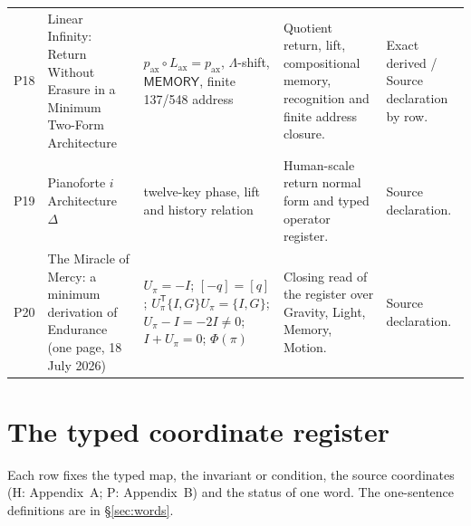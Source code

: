 \documentclass[11pt,a4paper]{article}
\newcommand{\tp}{^{\mathsf T}}
\newcommand{\Lax}{L_{\mathrm{ax}}}\newcommand{\Lpr}{L_{\mathrm{pr}}}
\newcommand{\MEM}{\mathsf{MEMORY}}
\theoremstyle{plain}
\theoremstyle{definition}
\theoremstyle{remark}
\begin{document}
{\begin{longtable}{@{}>{\raggedright\arraybackslash}p{0.8cm}>{\raggedright\arraybackslash}p{4.4cm}>{\raggedright\arraybackslash}p{4.4cm}>{\raggedright\arraybackslash}p{3.1cm}>{\raggedright\arraybackslash}p{2.1cm}@{}}
P18 & Linear Infinity: Return Without Erasure in a Minimum Two-Form Architecture & $p_{\mathrm{ax}}\circ\Lax=p_{\mathrm{ax}}$, $\Lambda$-shift, $\MEM$, finite 137/548 address & Quotient return, lift, compositional memory, recognition and finite address closure. & Exact derived / Source declaration by row.\\
P19 & Pianoforte $i$ Architecture $\Delta$ & twelve-key phase, lift and history relation & Human-scale return normal form and typed operator register. & Source declaration.\\
P20 & The Miracle of Mercy: a minimum derivation of Endurance (one page, 18 July 2026) & $U_\pi=-I$; $[-q]=[q]$; $U_\pi\tp\{I,G\}U_\pi=\{I,G\}$; $U_\pi-I=-2I\ne0$; $I+U_\pi=0$; $\Phi(\pi)$ & Closing read of the register over Gravity, Light, Memory, Motion. & Source declaration.\\
\end{longtable}}

\section{The typed coordinate register}\label{app:C}
Each row fixes the typed map, the invariant or condition, the source coordinates (H: Appendix~A; P: Appendix~B) and the status of one word. The one-sentence definitions are in \S\ref{sec:words}.
\end{document}
